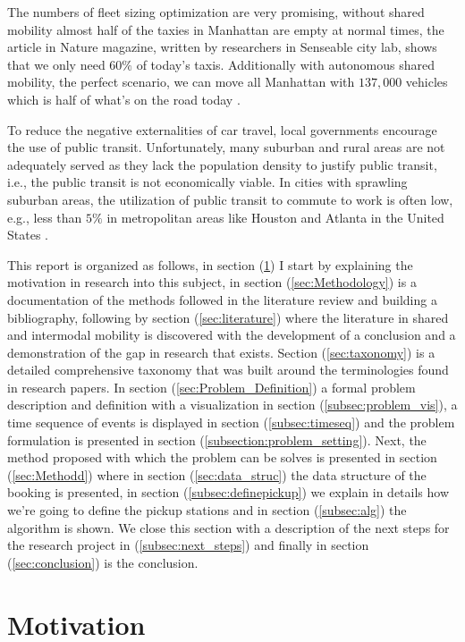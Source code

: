 \documentclass{article}
\begin{document}
The numbers of fleet sizing optimization are very promising, without shared mobility almost half of the taxies in Manhattan are empty at normal times, the article in Nature magazine, written by researchers in Senseable city lab\cite{senseable_city_lab}, shows that we only need $60\%$ of today\rq{s} taxis. Additionally with autonomous shared mobility, the perfect scenario, we can move all Manhattan with $137,000$ vehicles which is half of what\rq{s} on the road today \cite{senseable_city_lab}. 

To reduce the negative externalities of car travel, local governments encourage the use of public transit. Unfortunately, many suburban and rural areas are not adequately served as they lack the population density to justify public transit, i.e., the public transit is not economically viable. In cities with sprawling suburban areas, the utilization of public transit to commute to work is often low, e.g., less than $5\%$ in metropolitan areas like Houston and Atlanta in the United States \cite{STIGLIC201812}.


This report is organized as follows, in section (\ref{sec:Motivation}) I start by explaining the motivation in research into this subject, in section (\ref{sec:Methodology}) is a documentation of the methods followed in the literature review and building a bibliography, following by section (\ref{sec:literature}) where the literature in shared and intermodal mobility is discovered with the development of a conclusion and a demonstration of the gap in research that exists. Section (\ref{sec:taxonomy}) is a detailed comprehensive taxonomy that was built around the terminologies found in research papers. In section (\ref{sec:Problem_Definition}) a formal problem description and definition with a visualization in section (\ref{subsec:problem_vis}), a time sequence of events is displayed in section (\ref{subsec:timeseq}) and the problem formulation is presented in section (\ref{subsection:problem_setting}). Next, the method proposed with which the problem can be solves is presented in section (\ref{sec:Methodd}) where in section (\ref{sec:data_struc}) the data structure of the booking is presented, in section (\ref{subsec:definepickup}) we explain in details how we\rq{re} going to define the pickup stations and in section (\ref{subsec:alg}) the algorithm is shown.  We close this section with a description of the next steps for the research project in  (\ref{subsec:next_steps}) and finally in section (\ref{sec:conclusion}) is the conclusion.


\section{Motivation}
\label{sec:Motivation}
\end{document}
